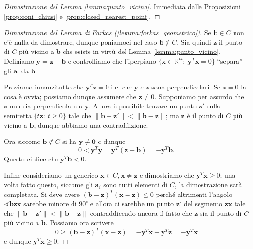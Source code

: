 \documentclass[italian, 12pt, reqno]{article}
\theoremstyle{myteo}
\numberwithin{equation}{section}
\begin{document}
\begin{proof}[Dimostrazione del Lemma \ref{lemma:punto_vicino}]
  Immediata dalle Proposizioni \ref{prop:coni_chiusi} e \ref{prop:closed_nearest_point}.
\end{proof}

\begin{proof}[Dimostrazione del Lemma di Farkas (\ref{lemma:farkas_geometrico})]
  Se \(\mathbf{b}\in C\) non c'è nulla da dimostrare, dunque poniamoci nel caso \(\mathbf{b}\not\in C\).
  Sia quindi \(\mathbf{z}\) il punto di \(C\) più vicino a \(\mathbf{b}\) che esiste in virtù del Lemma \ref{lemma:punto_vicino}.
  Definiamo \(\mathbf{y} = \mathbf{z} - \mathbf{b}\) e controlliamo che l'iperpiano \(\big\{\mathbf{x}\in \mathbb{R}^m\colon\ \mathbf{y}^T \mathbf{x} = 0\big\}\) ``separa'' gli \(\mathbf{a}_i\) da \(\mathbf{b}\).

  Proviamo innanzitutto che \(\mathbf{y}^T \mathbf{z} = 0\) i.e. che \(\mathbf{y}\) e \(\mathbf{z}\) sono perpendicolari.
  Se \(\mathbf{z} = 0\) la cosa è ovvia; possiamo dunque assumere che \(\mathbf{z}\neq0\).
  Supponiamo per assurdo che \(\mathbf{z}\) non sia perpendicolare a \(\mathbf{y}\).
  Allora è possibile trovare un punto \(\mathbf{z}'\) sulla semiretta \(\big\{t \mathbf{z}\colon\ t \ge 0\big\}\) tale che \(\|\mathbf{b} - \mathbf{z}'\| < \|\mathbf{b} - \mathbf{z}\|\); ma \(\mathbf{z}\) è il punto di \(C\) più vicino a \(\mathbf{b}\), dunque abbiamo una contraddizione.

  Ora siccome \(\mathbf{b}\not\in C\) si ha \(\mathbf{y}\neq \mathbf{0}\) e dunque
  \begin{equation*}
    0 < \mathbf{y}^T \mathbf{y} = \mathbf{y}^T(\mathbf{z} - \mathbf{b}) = -\mathbf{y}^T \mathbf{b}.
  \end{equation*}
  Questo ci dice che \(\mathbf{y}^T \mathbf{b} < 0\).

  Infine consideriamo un generico \(\mathbf{x}\in C, \mathbf{x}\neq \mathbf{z}\) e dimostriamo che \(\mathbf{y}^T \mathbf{x} \ge 0\); una volta fatto questo, siccome gli \(\mathbf{a}_i\) sono tutti elementi di \(C\), la dimostrazione sarà completata.
  Si deve avere \((\mathbf{b} - \mathbf{z})^T(\mathbf{x} - \mathbf{z}) \le 0\) perché altrimenti l'angolo \(\sphericalangle \mathbf{b}\mathbf{z}\mathbf{x}\) sarebbe minore di \(90^\circ\) e allora ci sarebbe un punto \(\mathbf{z}'\) del segmento \(\mathbf{z}\mathbf{x}\) tale che \(\|\mathbf{b} - \mathbf{z}'\| < \|\mathbf{b} - \mathbf{z}\|\) contraddicendo ancora il fatto che \(\mathbf{z}\) sia il punto di \(C\) più vicino a \(\mathbf{b}\).
  Possiamo ora scrivere
  \begin{equation*}
    0 \ge (\mathbf{b} - \mathbf{z})^T(\mathbf{x} - \mathbf{z}) = -\mathbf{y}^T \mathbf{x} + \mathbf{y}^T \mathbf{z} = -\mathbf{y}^T \mathbf{x}
  \end{equation*}
  e dunque \(\mathbf{y}^T \mathbf{x} \ge 0\).
\end{proof}
\end{document}
